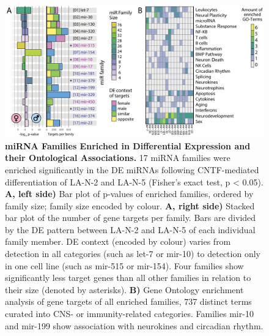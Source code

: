 \begin{figure}
\centering
\includegraphics[width=\textwidth]{figures/mir-de-fam-go}
\caption[Differential Expression miRNA Family Enrichment]{\textbf{miRNA Families Enriched in Differential Expression and their Ontological Associations.} 17 miRNA families were enriched significantly in the DE miRNAs following CNTF-mediated differentiation of LA-N-2 and LA-N-5 (Fisher's exact test, p < 0.05). \textbf{A, left side)} Bar plot of p-values of enriched families, ordered by family size; family size encoded by colour. \textbf{A, right side)} Stacked bar plot of the number of gene targets per family. Bars are divided by the DE pattern between LA-N-2 and LA-N-5 of each individual family member. DE context (encoded by colour) varies from detection in all categories (such as let-7 or mir-10) to detection only in one cell line (such as mir-515 or mir-154). Four families show significantly less target genes than all other families in relation to their size (denoted by asterisks). \textbf{B)} Gene Ontology enrichment analysis of gene targets of all enriched families, 737 distinct terms curated into CNS- or immunity-related categories. Families mir-10 and mir-199 show association with neurokines and circadian rhythm.
\label{fig:mir-de-fam-go}}
\end{figure}